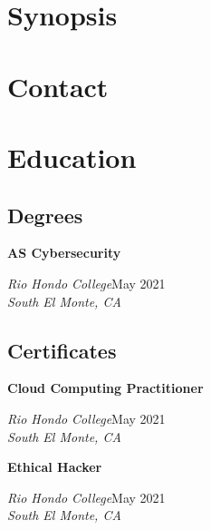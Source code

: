 \documentclass[a4paper]{article}
\begin{document}
\begin{minipage}[t]{0.36\textwidth}
  \raggedright
  \vspace*{0pt}
          {\bfseries\LARGE\textsf\appfirstname{}} {\bfseries\LARGE\textsf\applastname{}}

          \section{Synopsis}
          \appsynopsis{}

          \section{Contact}
          \vbox{
          }

          \section{Education}
          \subsection{Degrees}
          \textbf{AS Cybersecurity}\par
          \textit{Rio Hondo College}\hfill May 2021 \\
          \textit{South El Monte, CA}

          \subsection{Certificates}
          \textbf{Cloud Computing Practitioner}\par
          \textit{Rio Hondo College}\hfill May 2021 \\
          \textit{South El Monte, CA}

          \textbf{Ethical Hacker}\par
          \textit{Rio Hondo College}\hfill May 2021 \\
          \textit{South El Monte, CA}
          
\end{minipage}\hfill
\end{document}
